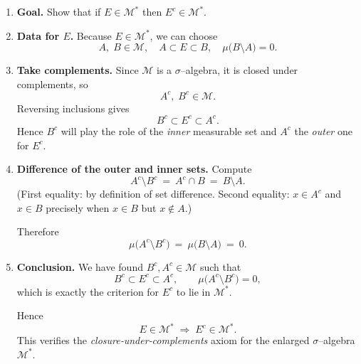\documentclass[12pt]{article}
\title{}
\author{Jerich Lee}
\date{\today}
\theoremstyle{definition} %
\theoremstyle{plain} %
\begin{document}
\maketitle
\begin{enumerate}[label=\textbf{(ii)}]
  \item \textbf{Goal.}  
        Show that if $E\in\mathcal{M}^{*}$ then $E^{c}\in\mathcal{M}^{*}$.

  \item \textbf{Data for $E$.}  
        Because $E\in\mathcal{M}^{*}$, we can choose
        \[
            A,\;B\in\mathcal{M},
            \quad
            A\subset E\subset B,
            \quad
            \mu\!\bigl(B\setminus A\bigr)=0.
        \]

  \item \textbf{Take complements.}  
        Since $\mathcal{M}$ is a $\sigma$–algebra, it is closed under complements, so
        \[
            A^{c},\;B^{c}\in\mathcal{M}.
        \]
        Reversing inclusions gives
        \[
            B^{c}\subset E^{c}\subset A^{c}.
        \]
        Hence $B^{c}$ will play the role of the \emph{inner} measurable set
        and $A^{c}$ the \emph{outer} one for $E^{c}$.

  \item \textbf{Difference of the outer and inner sets.}  
        Compute
        \[
            A^{c}\setminus B^{c}
            ~=~A^{c}\cap B
            ~=~B\setminus A.
        \]
        (First equality: by definition of set difference.
         Second equality: $x\in A^{c}$ and $x\in B$ precisely when $x\in B$ but $x\notin A$.)

        Therefore
        \[
            \mu\bigl(A^{c}\setminus B^{c}\bigr)
            ~=~\mu\bigl(B\setminus A\bigr)
            ~=~0.
        \]

  \item \textbf{Conclusion.}  
        We have found $B^{c},A^{c}\in\mathcal{M}$ such that
        \[
            B^{c}\subset E^{c}\subset A^{c},
            \qquad
            \mu\bigl(A^{c}\setminus B^{c}\bigr)=0,
        \]
        which is exactly the criterion for $E^{c}$ to lie in $\mathcal{M}^{*}$.

        Hence
        \[
            E\in\mathcal{M}^{*}\;\Longrightarrow\;E^{c}\in\mathcal{M}^{*}.
        \]
        This verifies the \emph{closure‐under‐complements} axiom for the enlarged $\sigma$–algebra $\mathcal{M}^{*}$.
\end{enumerate}
\end{document}
